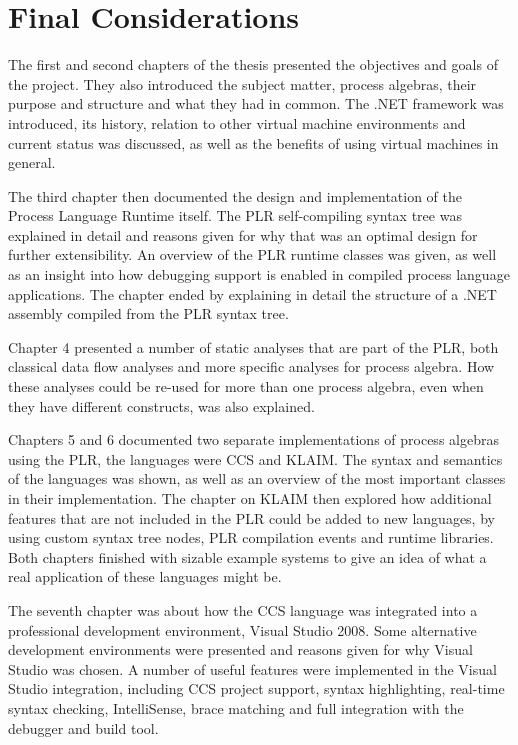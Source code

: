 \chapter{Final Considerations}

	The first and second chapters of the thesis presented the objectives and 
	goals of the project. They also introduced the subject matter, process 
	algebras, their purpose and structure and what they had in common. The .NET 
	framework was introduced, its history, relation to other virtual 
	machine environments and current status was discussed, as well as the 
	benefits of using virtual machines in general.
	
	The third chapter then documented the design and implementation of the 
	Process Language Runtime itself. The PLR self-compiling syntax tree was 
	explained in detail and reasons given for why that was an optimal design for 
	further extensibility. An overview of the PLR runtime classes was given, as 
	well as an insight into how debugging support is enabled in compiled process 
	language applications. The chapter ended by explaining in detail the 
	structure of a .NET assembly compiled from the PLR syntax tree.
	
	Chapter 4 presented a number of static analyses that are part of the PLR, 
	both classical data flow analyses and more specific analyses for process 
	algebra. How these analyses could be re-used for more than one process 
	algebra, even when they have different constructs, was also explained.
	
	Chapters 5 and 6 documented two separate implementations of process algebras 
	using the PLR, the languages were CCS and KLAIM. The syntax and semantics of 
	the languages was shown, as well as an overview of the most important 
	classes in their implementation. The chapter on KLAIM then explored how 
	additional features that are not included in the PLR could be added to new 
	languages, by using custom syntax tree nodes, PLR compilation events and 
	runtime libraries. Both chapters finished with sizable example systems to 
	give an idea of what a real application of these languages might be.
	
	The seventh chapter was about how the CCS language was integrated into a 
	professional development environment, Visual Studio 2008. Some alternative 
	development environments were presented and reasons given for why Visual 
	Studio was chosen. A number of useful features were implemented in the 
	Visual Studio integration, including CCS project support, syntax 
	highlighting, real-time syntax checking, IntelliSense, brace matching and 
	full integration with the debugger and build tool.
	
